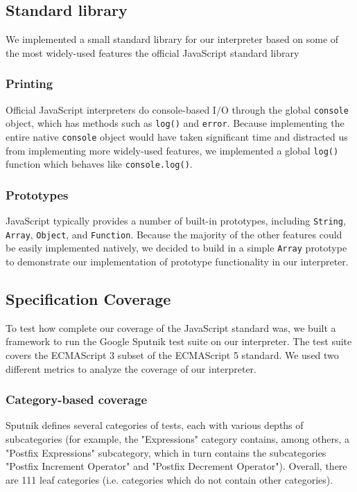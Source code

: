 \documentclass{article}
\begin{document}
\begin{multicols}{2}
\subsection*{Standard library}

We implemented a small standard library for our interpreter based on some of the
most widely-used features the official JavaScript standard library

\subsubsection*{Printing}

Official JavaScript interpreters do console-based I/O through the global
\texttt{console} object, which has methods such as \texttt{log()} and
\texttt{error}. Because implementing the entire native \texttt{console} object
would have taken significant time and distracted us from implementing more
widely-used features, we implemented a global \texttt{log()} function which
behaves like \texttt{console.log()}.

\subsubsection*{Prototypes}

JavaScript typically provides a number of built-in prototypes, including
\texttt{String}, \texttt{Array}, \texttt{Object}, and \texttt{Function}. Because
the majority of the other features could be easily implemented natively, we
decided to build in a simple \texttt{Array} prototype to demonstrate our
implementation of prototype functionality in our interpreter.

\subsection{Specification Coverage}

To test how complete our coverage of the JavaScript standard was, we built a
framework to run the Google Sputnik test
suite\cite{sputnik} on our
interpreter. The test suite covers the ECMAScript 3 subset of the ECMAScript 5
standard. We used two different metrics to analyze the coverage of our
interpreter.

\subsubsection*{Category-based coverage}

Sputnik defines several categories of tests, each with various depths of subcategories
(for example, the "Expressions" category contains, among others, a "Postfix
Expressions" subcategory, which in turn contains the subcategories "Postfix
Increment Operator" and "Postfix Decrement Operator"). Overall, there are 111
leaf categories (i.e. categories which do not contain other categories). \newline


\end{multicols}
\end{document}
